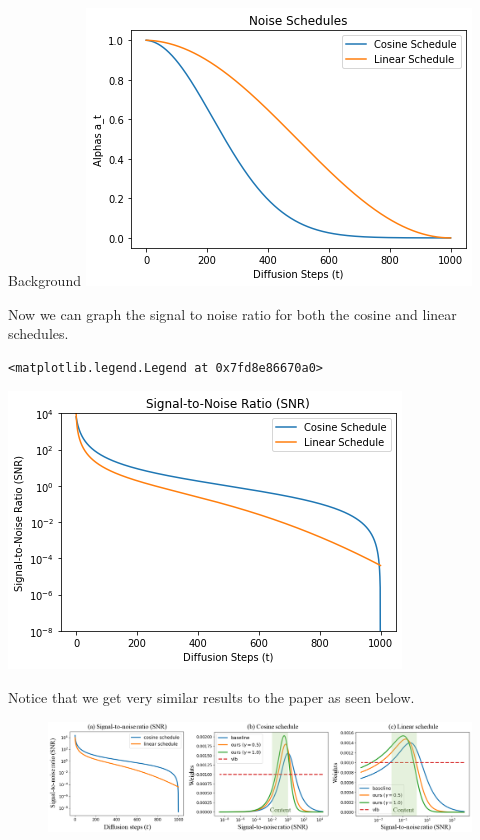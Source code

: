 \documentclass[
  ignorenonframetext,
]{beamer}
\begin{document}
\begin{frame}[fragile]{Background}
\includegraphics{Perception Prioritized Training of Diffusion Models_files/figure-beamer/cell-7-output-2.png}

Now we can graph the signal to noise ratio for both the cosine and
linear schedules.

\begin{verbatim}
<matplotlib.legend.Legend at 0x7fd8e86670a0>
\end{verbatim}

\includegraphics{Perception Prioritized Training of Diffusion Models_files/figure-beamer/cell-8-output-2.png}

Notice that we get very similar results to the paper as seen below.

\begin{figure}

{\centering \includegraphics{Perception Prioritized Training of Diffusion Models_files/figure-beamer/161203299-8b02d76b-9c51-4529-8329-3ac08e9f3bc8.png}

}
\end{figure}
\end{frame}
\end{document}
